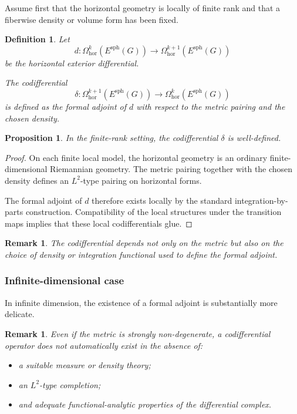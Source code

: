 \documentclass[11pt]{amsart}
\newtheorem{proposition}[theorem]{Proposition}
\newtheorem{definition}[theorem]{Definition}
\newtheorem{remark}[theorem]{Remark}
\begin{document}
Assume first that the horizontal geometry is locally of finite rank and that a
fiberwise density or volume form has been fixed.

\begin{definition}
Let
\[
d:
\Omega^k_{\mathrm{hor}}
(E^{\mathrm{sph}}(G))
\longrightarrow
\Omega^{k+1}_{\mathrm{hor}}
(E^{\mathrm{sph}}(G))
\]
be the horizontal exterior differential.

The codifferential
\[
\delta:
\Omega^{k+1}_{\mathrm{hor}}
(E^{\mathrm{sph}}(G))
\longrightarrow
\Omega^{k}_{\mathrm{hor}}
(E^{\mathrm{sph}}(G))
\]
is defined as the formal adjoint of \(d\) with respect to the metric pairing
and the chosen density.
\end{definition}

\begin{proposition}
In the finite-rank setting, the codifferential \(\delta\) is well-defined.
\end{proposition}

\begin{proof}
On each finite local model, the horizontal geometry is an ordinary
finite-dimensional Riemannian geometry. The metric pairing together with the
chosen density defines an \(L^2\)-type pairing on horizontal forms.

The formal adjoint of \(d\) therefore exists locally by the standard
integration-by-parts construction. Compatibility of the local structures under
the transition maps implies that these local codifferentials glue.
\end{proof}

\begin{remark}
The codifferential depends not only on the metric but also on the choice of
density or integration functional used to define the formal adjoint.
\end{remark}

\subsubsection{Infinite-dimensional case}

In infinite dimension, the existence of a formal adjoint is substantially more
delicate.

\begin{remark}
Even if the metric is strongly non-degenerate, a codifferential operator does
not automatically exist in the absence of:
\begin{itemize}
\item a suitable measure or density theory;
\item an \(L^2\)-type completion;
\item and adequate functional-analytic properties of the differential complex.
\end{itemize}
\end{remark}
\end{document}

